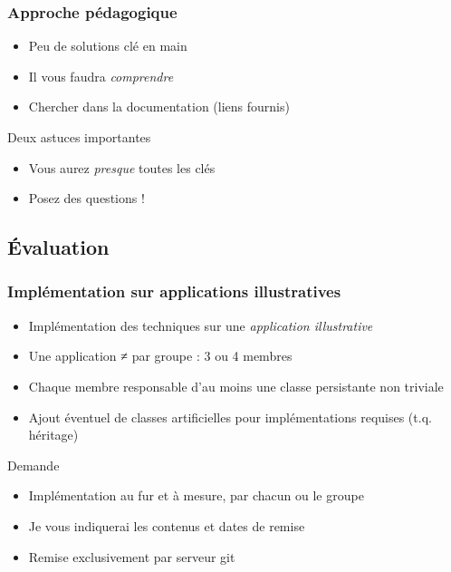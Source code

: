 \documentclass[english, french]{beamer}
\begin{document}
\begin{frame}
	\frametitle{Approche pédagogique}
	\begin{itemize}
		\item Peu de solutions clé en main
		\item Il vous faudra \emph{comprendre}
		\item Chercher dans la documentation (liens fournis)
	\end{itemize}
	\begin{block}{Deux astuces importantes}
		\begin{itemize}
			\item Vous aurez \emph{presque} toutes les clés
			\item Posez des questions !
		\end{itemize}
	\end{block}
\end{frame}

\subsection{Évaluation}
\begin{frame}
	\frametitle{Implémentation sur applications illustratives}
	
	\begin{itemize}
		\item Implémentation des techniques sur une \emph{application illustrative}
		\item Une application ≠ par groupe : 3 ou 4 membres
		\item Chaque membre responsable d’au moins une classe persistante non triviale
		\item Ajout éventuel de classes artificielles pour implémentations requises (t.q. héritage)
	\end{itemize}
	\begin{block}{Demande}
		\begin{itemize}
			\item Implémentation au fur et à mesure, par chacun ou le groupe
			\item Je vous indiquerai les contenus et dates de remise
			\item Remise exclusivement par serveur git
		\end{itemize}
	\end{block}
\end{frame}
\end{document}
